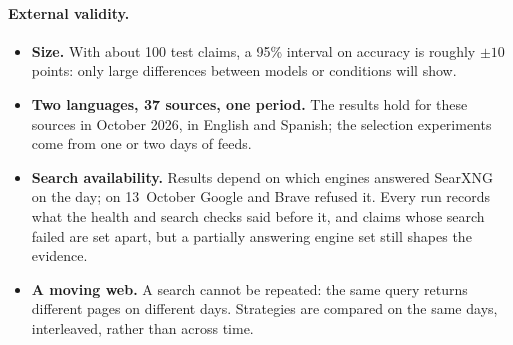\paragraph{External validity.}
\begin{itemize}
    \item \textbf{Size.} With about 100 test claims, a 95\% interval on
    accuracy is roughly $\pm10$ points: only large differences between
    models or conditions will show.
    \item \textbf{Two languages, 37 sources, one period.} The results
    hold for these sources in October 2026, in English and Spanish; the
    selection experiments come from one or two days of feeds.
    \item \textbf{Search availability.} Results depend on which engines
    answered SearXNG on the day; on 13~October Google and Brave refused
    it. Every run records what the health and search checks said
    before it, and claims whose search failed are set apart, but a
    partially answering engine set still shapes the evidence.
    \item \textbf{A moving web.} A search cannot be repeated: the same
    query returns different pages on different days. Strategies are
    compared on the same days, interleaved, rather than across time.
\end{itemize}
